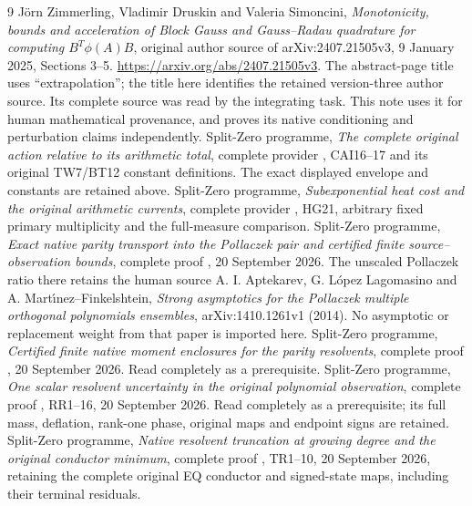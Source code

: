 \documentclass[11pt]{article}
\begin{document}
\begin{thebibliography}{9}
 J\"orn Zimmerling, Vladimir Druskin and Valeria Simoncini,
\emph{Monotonicity, bounds and acceleration of Block Gauss and
Gauss--Radau quadrature for computing $B^T\phi(A)B$}, original
author source of arXiv:2407.21505v3, 9 January 2025, Sections 3--5.
\url{https://arxiv.org/abs/2407.21505v3}.
The abstract-page title uses ``extrapolation''; the title here
identifies the retained version-three author source. Its complete
source was read by the integrating task. This note uses it for
human mathematical provenance, and proves its native conditioning
and perturbation claims independently.
 Split-Zero programme, \emph{The complete original action
relative to its arithmetic total}, complete provider
, CAI16--17 and its original
TW7/BT12 constant definitions. The exact displayed envelope and
constants are retained above.
 Split-Zero programme, \emph{Subexponential heat cost and
the original arithmetic currents}, complete provider
, HG21, arbitrary
fixed primary multiplicity and the full-measure comparison.
 Split-Zero programme, \emph{Exact native parity transport
into the Pollaczek pair and certified finite source--observation
bounds}, complete proof
,
20 September 2026. The unscaled Pollaczek ratio there retains the
human source A. I. Aptekarev, G. L\'opez Lagomasino and
A. Mart\'{\i}nez--Finkelshtein, \emph{Strong asymptotics for the
Pollaczek multiple orthogonal polynomials ensembles},
arXiv:1410.1261v1 (2014). No asymptotic or replacement weight from
that paper is imported here.
 Split-Zero programme, \emph{Certified finite native moment
enclosures for the parity resolvents}, complete proof
,
20 September 2026. Read completely as a prerequisite.
 Split-Zero programme, \emph{One scalar resolvent
uncertainty in the original polynomial observation}, complete proof
, RR1--16, 20 September 2026.
Read completely as a prerequisite; its full mass, deflation,
rank-one phase, original maps and endpoint signs are retained.
 Split-Zero programme, \emph{Native resolvent truncation at
growing degree and the original conductor minimum}, complete proof
, TR1--10,
20 September 2026, retaining the complete original EQ conductor
and signed-state maps, including their terminal residuals.
\end{thebibliography}
\end{document}
